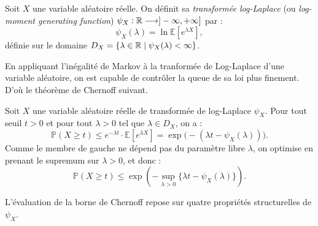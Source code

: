 \begin{definition}
    Soit $X$ une variable aléatoire réelle. On définit sa \emph{transformée log-Laplace} (ou \emph{log-moment generating function}) $\psi_X : \mathbb{R} \longrightarrow ]-\infty, +\infty]$ par :
    \begin{equation}
       \boxed{ \psi_X(\lambda) = \ln \mathbb{E}\left[ e^{\lambda X} \right]},
    \end{equation}
    définie sur le domaine $D_X = \{\lambda \in \mathbb{R} \mid \psi_X(\lambda) < \infty\}$.
\end{definition}

En appliquant l'inégalité de Markov à la tranformée de Log-Laplace d'une variable aléatoire, on est capable de contrôler la queue de sa loi plus finement. D'où le théorème de Chernoff suivant. 

\begin{theorem} \label{thrm:chernoff-bound}
    Soit $X$ une variable aléatoire réelle de transformée de log-Laplace $ \psi_X$. Pour tout seuil $t > 0$ et pour tout $\lambda > 0$ tel que $\lambda \in D_X$, on a : 
    \begin{equation}
        \mathbb{P}(X \geqslant t) \leqslant e^{-\lambda t} \cdot \mathbb{E}\left[ e^{\lambda X} \right] = \exp\big( -(\lambda t - \psi_X(\lambda)) \big).
    \end{equation}
    Comme le membre de gauche ne dépend pas du paramètre libre $\lambda$, on optimise en prenant le supremum sur $\lambda > 0$, et donc : 
    \begin{equation}
        \mathbb{P}(X \geqslant t) \leqslant \exp\left( - \sup_{\lambda > 0} \{ \lambda t - \psi_X(\lambda) \} \right).
    \end{equation}
\end{theorem}

L'évaluation de la borne de Chernoff repose sur quatre propriétés structurelles de $\psi_X$.

